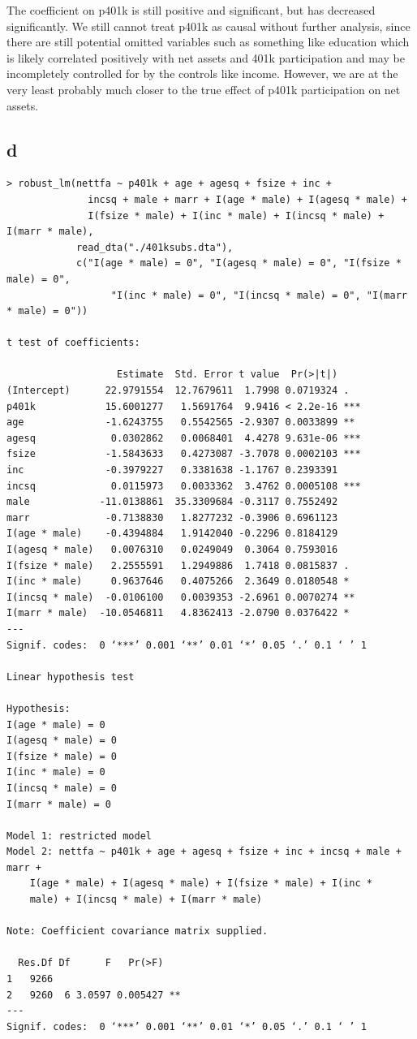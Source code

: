 \documentclass[12pt,letterpaper]{article}
\theoremstyle{definition}
\begin{document}
The coefficient on p401k is still positive and significant, but has decreased significantly. We still cannot treat p401k as causal without further analysis, since there are still potential omitted variables such as something like education which is likely correlated positively with net assets and 401k participation and may be incompletely controlled for by the controls like income. However, we are at the very least probably much closer to the true effect of p401k participation on net assets.

\subsection*{d}

\begin{Verbatim}[fontsize=\small]
> robust_lm(nettfa ~ p401k + age + agesq + fsize + inc +
              incsq + male + marr + I(age * male) + I(agesq * male) +
              I(fsize * male) + I(inc * male) + I(incsq * male) + I(marr * male),
            read_dta("./401ksubs.dta"),
            c("I(age * male) = 0", "I(agesq * male) = 0", "I(fsize * male) = 0",
                  "I(inc * male) = 0", "I(incsq * male) = 0", "I(marr * male) = 0"))

t test of coefficients:

                   Estimate  Std. Error t value  Pr(>|t|)
(Intercept)      22.9791554  12.7679611  1.7998 0.0719324 .
p401k            15.6001277   1.5691764  9.9416 < 2.2e-16 ***
age              -1.6243755   0.5542565 -2.9307 0.0033899 **
agesq             0.0302862   0.0068401  4.4278 9.631e-06 ***
fsize            -1.5843633   0.4273087 -3.7078 0.0002103 ***
inc              -0.3979227   0.3381638 -1.1767 0.2393391
incsq             0.0115973   0.0033362  3.4762 0.0005108 ***
male            -11.0138861  35.3309684 -0.3117 0.7552492
marr             -0.7138830   1.8277232 -0.3906 0.6961123
I(age * male)    -0.4394884   1.9142040 -0.2296 0.8184129
I(agesq * male)   0.0076310   0.0249049  0.3064 0.7593016
I(fsize * male)   2.2555591   1.2949886  1.7418 0.0815837 .
I(inc * male)     0.9637646   0.4075266  2.3649 0.0180548 *
I(incsq * male)  -0.0106100   0.0039353 -2.6961 0.0070274 **
I(marr * male)  -10.0546811   4.8362413 -2.0790 0.0376422 *
---
Signif. codes:  0 ‘***’ 0.001 ‘**’ 0.01 ‘*’ 0.05 ‘.’ 0.1 ‘ ’ 1

Linear hypothesis test

Hypothesis:
I(age * male) = 0
I(agesq * male) = 0
I(fsize * male) = 0
I(inc * male) = 0
I(incsq * male) = 0
I(marr * male) = 0

Model 1: restricted model
Model 2: nettfa ~ p401k + age + agesq + fsize + inc + incsq + male + marr +
    I(age * male) + I(agesq * male) + I(fsize * male) + I(inc *
    male) + I(incsq * male) + I(marr * male)

Note: Coefficient covariance matrix supplied.

  Res.Df Df      F   Pr(>F)
1   9266
2   9260  6 3.0597 0.005427 **
---
Signif. codes:  0 ‘***’ 0.001 ‘**’ 0.01 ‘*’ 0.05 ‘.’ 0.1 ‘ ’ 1
\end{Verbatim}
\end{document}
